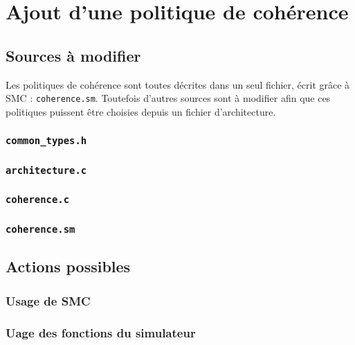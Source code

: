 \section{Ajout d'une politique de cohérence}
\label{tuto_aut}

\subsection{Sources à modifier}

Les politiques de cohérence sont toutes décrites dans un seul fichier, écrit grâce à \textsf{SMC} : \texttt{coherence.sm}. Toutefois d'autres sources sont à modifier afin que ces politiques puissent être choisies depuis un fichier d'architecture.

\subsubsection{\texttt{common\_types.h}}

\subsubsection{\texttt{architecture.c}}

\subsubsection{\texttt{coherence.c}}

\subsubsection{\texttt{coherence.sm}}

\subsection{Actions possibles}

\subsubsection{Usage de \textsf{SMC}}

\subsubsection{Uage des fonctions du simulateur}
